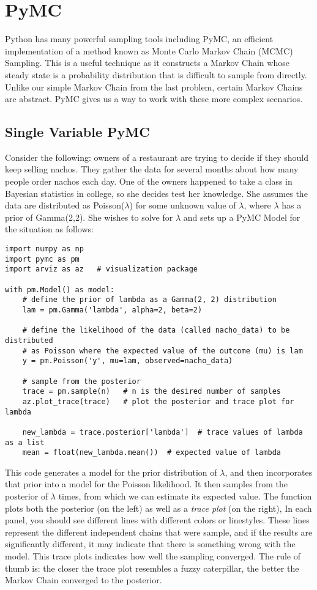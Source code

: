 \section*{PyMC}
Python has many powerful sampling tools including PyMC, an efficient implementation of a method known as Monte Carlo Markov Chain (MCMC) Sampling.
This is a useful technique as it constructs a Markov Chain whose steady state is a probability distribution that is difficult to sample from directly.
Unlike our simple Markov Chain from the last problem, certain Markov Chains are abstract. PyMC gives us a way to work with these more complex scenarios.

\subsection*{Single Variable PyMC}
Consider the following: owners of a restaurant are trying to decide if they should keep selling nachos.
They gather the data for several months about how many people order nachos each day.
One of the owners happened to take a class in Bayesian statistics in college, so she decides test her knowledge.
She assumes the data are distributed as Poisson($\lambda$) for some unknown value of $\lambda$, where $\lambda$ has a prior of Gamma(2,2).
She wishes to solve for $\lambda$ and sets up a PyMC Model for the situation as follows: 

\begin{lstlisting}
import numpy as np
import pymc as pm
import arviz as az   # visualization package

with pm.Model() as model:
    # define the prior of lambda as a Gamma(2, 2) distribution
    lam = pm.Gamma('lambda', alpha=2, beta=2)

    # define the likelihood of the data (called nacho_data) to be distributed
    # as Poisson where the expected value of the outcome (mu) is lam 
    y = pm.Poisson('y', mu=lam, observed=nacho_data)

    # sample from the posterior
    trace = pm.sample(n)   # n is the desired number of samples
    az.plot_trace(trace)   # plot the posterior and trace plot for lambda

    new_lambda = trace.posterior['lambda']  # trace values of lambda as a list
    mean = float(new_lambda.mean())  # expected value of lambda
\end{lstlisting}

This code generates a model for the prior distribution of $\lambda$, and then incorporates that prior into a model for the Poisson likelihood.
It then samples from the posterior of $\lambda$  times, from which we can estimate its expected value.
The function  plots both the posterior (on the left) as well as a \emph{trace plot} (on the right),
In each panel, you should see different lines with different colors or linestyles.
These lines represent the different independent chains that were sample, and if the results are significantly different, it may indicate that there is something wrong with the model.
This trace plots indicates how well the sampling converged.
The rule of thumb is: the closer the trace plot resembles a fuzzy caterpillar, the better the Markov Chain converged to the posterior.

